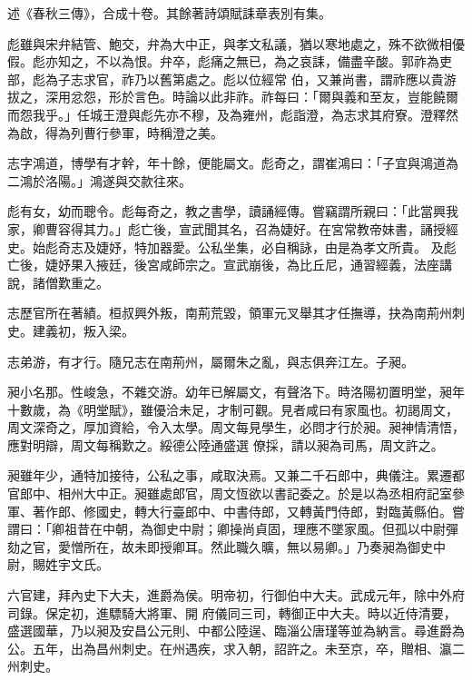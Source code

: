 \begin{pinyinscope}
 述《春秋三傳》，合成十卷。其餘著詩頌賦誄章表別有集。



 彪雖與宋弁結管、鮑交，弁為大中正，與孝文私議，猶以寒地處之，殊不欲微相優假。彪亦知之，不以為恨。弁卒，彪痛之無已，為之哀誄，備盡辛酸。郭祚為吏部，彪為子志求官，祚乃以舊第處之。彪以位經常
 伯，又兼尚書，謂祚應以貴游拔之，深用忿怨，形於言色。時論以此非祚。祚每曰：「爾與義和至友，豈能饒爾而怨我乎。」任城王澄與彪先亦不穆，及為雍州，彪詣澄，為志求其府寮。澄釋然為啟，得為列曹行參軍，時稱澄之美。



 志字鴻道，博學有才幹，年十餘，便能屬文。彪奇之，謂崔鴻曰：「子宜與鴻道為二鴻於洛陽。」鴻遂與交款往來。



 彪有女，幼而聰令。彪每奇之，教之書學，讀誦經傳。嘗竊謂所親曰：「此當興我家，卿曹容得其力。」彪亡後，宣武聞其名，召為婕好。在宮常教帝妹書，誦授經史。始彪奇志及婕妤，特加器愛。公私坐集，必自稱詠，由是為孝文所貴。
 及彪亡後，婕妤果入掖廷，後宮咸師宗之。宣武崩後，為比丘尼，通習經義，法座講說，諸僧歎重之。



 志歷官所在著績。桓叔興外叛，南荊荒毀，領軍元叉舉其才任撫導，抉為南荊州刺史。建義初，叛入梁。



 志弟游，有才行。隨兄志在南荊州，屬爾朱之亂，與志俱奔江左。子昶。



 昶小名那。性峻急，不雜交游。幼年已解屬文，有聲洛下。時洛陽初置明堂，昶年十數歲，為《明堂賦》，雖優洽未足，才制可觀。見者咸曰有家風也。初謁周文，周文深奇之，厚加資給，令入太學。周文每見學生，必問才行於昶。昶神情清悟，應對明辯，周文每稱歎之。綏德公陸通盛選
 僚採，請以昶為司馬，周文許之。



 昶雖年少，通特加接待，公私之事，咸取決焉。又兼二千石郎中，典儀注。累遷都官郎中、相州大中正。昶雖處郎官，周文恆欲以書記委之。於是以為丞相府記室參軍、著作郎、修國史，轉大行臺郎中、中書侍郎，又轉黃門侍郎，對臨黃縣伯。嘗謂曰：「卿祖昔在中朝，為御史中尉；卿操尚貞固，理應不墜家風。但孤以中尉彈劾之官，愛憎所在，故未即授卿耳。然此職久曠，無以易卿。」乃奏昶為御史中尉，賜姓宇文氏。



 六官建，拜內史下大夫，進爵為侯。明帝初，行御伯中大夫。武成元年，除中外府司錄。保定初，進驃騎大將軍、開
 府儀同三司，轉御正中大夫。時以近侍清要，盛選國華，乃以昶及安昌公元則、中都公陸逞、臨淄公唐瑾等並為納言。尋進爵為公。五年，出為昌州刺史。在州遇疾，求入朝，詔許之。未至京，卒，贈相、瀛二州刺史。




\end{pinyinscope}
